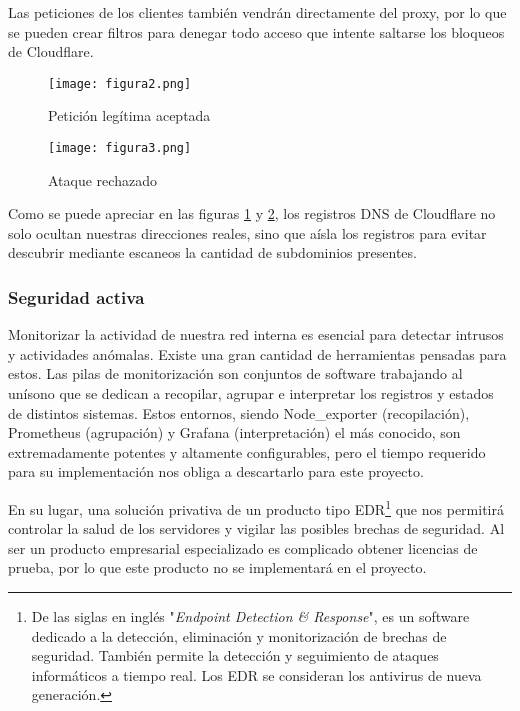 Las peticiones de los clientes también vendrán directamente del proxy, por lo que se pueden crear filtros para denegar todo acceso que intente saltarse los bloqueos de Cloudflare.

\begin{figure}[H]
  \centering
  \texttt{[image: figura2.png]}
  \caption{Petición legítima aceptada}
  \label{fig:DNSProxyAceptado}
\end{figure}
\begin{figure}[H]
  \centering
  \texttt{[image: figura3.png]}
  \caption{Ataque rechazado}
  \label{fig:DNSProxyRechazado}
\end{figure}

Como se puede apreciar en las figuras \ref{fig:DNSProxyAceptado} y \ref{fig:DNSProxyRechazado}, los registros DNS de Cloudflare no solo ocultan nuestras direcciones reales, sino que aísla los registros para evitar descubrir mediante escaneos la cantidad de subdominios presentes.

\subsubsection{Seguridad activa}

Monitorizar la actividad de nuestra red interna es esencial para detectar intrusos y actividades anómalas. Existe una gran cantidad de herramientas pensadas para estos. Las pilas de monitorización son conjuntos de software trabajando al unísono que se dedican a recopilar, agrupar e interpretar los registros y estados de distintos sistemas. Estos entornos, siendo Node\_exporter (recopilación), Prometheus (agrupación) y Grafana (interpretación) el más conocido, son extremadamente potentes y altamente configurables, pero el tiempo requerido para su implementación nos obliga a descartarlo para este proyecto.

En su lugar, una solución privativa de un producto tipo EDR\footnote{De las siglas en inglés "\textit{Endpoint Detection \& Response}", es un software dedicado a la detección, eliminación y monitorización de brechas de seguridad. También permite la detección y seguimiento de ataques informáticos a tiempo real. Los EDR se consideran los antivirus de nueva generación.} que nos permitirá controlar la salud de los servidores y vigilar las posibles brechas de seguridad. Al ser un producto empresarial especializado es complicado obtener licencias de prueba, por lo que este producto no se implementará en el proyecto.

